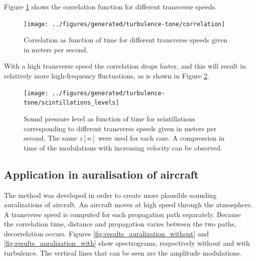 Figure \ref{fig:results_scintillations_correlation} shows the correlation function for
different transverse speeds.
\begin{figure}[H]
  \centering
  \texttt{[image: ../figures/generated/turbulence-tone/correlation]}
  \caption{Correlation as function of time for different transverse speeds given in meters per second.}
  \label{fig:results_scintillations_correlation}
\end{figure}
With a high transverse speed the correlation drops
faster, and this will result in relatively more high-frequency fluctuations, as is shown in Figure \ref{fig:results_scintillations_levels}.
\begin{figure}[H]
  \centering
  \texttt{[image: ../figures/generated/turbulence-tone/scintillations\_levels]}
  \caption{Sound pressure level as function of time for scintillations
corresponding to different transverse speeds given in meters per second. The
same $z[n]$ were used for each case. A compression in time of the modulations with increasing velocity can be observed.}
  \label{fig:results_scintillations_levels}
\end{figure}


\subsection{Application in auralisation of aircraft}
The method was developed in order to create more plausible sounding
auralizations of aircraft. An aircraft moves at high speed through the
atmosphere. A transverse speed is computed for each propagation path separately.
Because the correlation time, distance and propagation varies between the two
paths, decorrelation occurs. Figures \ref{fig:results_auralization_without} and
\ref{fig:results_auralization_with} show spectrograms, respectively without and
with turbulence. The vertical lines that can be seen are the amplitude
modulations.

